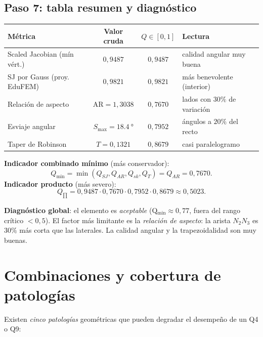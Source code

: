 \documentclass[11pt,a4paper]{article}
\begin{document}
\subsection{Paso 7: tabla resumen y diagn\'ostico}

\begin{center}
\renewcommand{\arraystretch}{1.15}
\begin{tabular}{l c c l}
\toprule
\textbf{M\'etrica} & \textbf{Valor cruda} & \textbf{$Q\in[0,1]$} & \textbf{Lectura} \\
\midrule
Scaled Jacobian (m\'in v\'ert.)  & $0{,}9487$           & $0{,}9487$ & calidad angular muy buena \\
SJ por Gauss (proy. EduFEM)      & $0{,}9821$           & $0{,}9821$ & m\'as benevolente (interior) \\
Relaci\'on de aspecto            & $\mathrm{AR}=1{,}3038$ & $0{,}7670$ & lados con $30\%$ de variaci\'on \\
Esviaje angular                  & $S_{\max}=\SI{18,4}{\degree}$ & $0{,}7952$ & \'angulos a $20\%$ del recto \\
Taper de Robinson                & $T=0{,}1321$         & $0{,}8679$ & casi paralelogramo \\
\bottomrule
\end{tabular}
\end{center}

\noindent\textbf{Indicador combinado m\'inimo} (m\'as conservador):
\[
  Q_{\min} = \min(Q_{SJ},Q_{AR},Q_{sk},Q_T) = Q_{AR} = 0{,}7670.
\]
\textbf{Indicador producto} (m\'as severo):
\[
  Q_{\prod} = 0{,}9487 \cdot 0{,}7670 \cdot 0{,}7952 \cdot 0{,}8679 \approx 0{,}5023.
\]

\textbf{Diagn\'ostico global}: el elemento es \emph{aceptable} (Q$_{\min}\approx 0{,}77$, fuera del
rango cr\'itico $<\!0{,}5$). El factor m\'as limitante es la \emph{relaci\'on de aspecto}: la
arista $N_2 N_3$ es $30\%$ m\'as corta que las laterales. La calidad angular y la
trapezoidalidad son muy buenas.

\section{Combinaciones y cobertura de patolog\'ias}

Existen \emph{cinco patolog\'ias} geom\'etricas que pueden degradar el desempe\~no de un Q4 o Q9:
\end{document}
